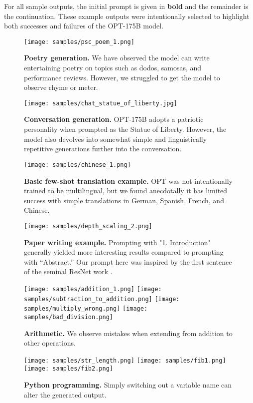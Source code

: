 \documentclass[11pt]{article}
\newcommand{\OPT}[0]{{OPT-175B}}
\begin{document}
For all sample outputs, the initial prompt is given in {\bf bold} and the remainder is the continuation. These example outputs were intentionally selected to highlight both successes and failures of the \OPT{} model.

\begin{figure}[h]
    \centering
    \texttt{[image: samples/psc\_poem\_1.png]}
    \caption{{\bf Poetry generation.} We have observed the model can write entertaining poetry on topics such as dodos, samosas, and performance reviews. However, we struggled to get the model to observe rhyme or meter.}
    \label{fig:psc_poem}
\end{figure}

\begin{figure}[h]
    \centering
    \texttt{[image: samples/chat\_statue\_of\_liberty.jpg]}
    \caption{{\bf Conversation generation.} \OPT{} adopts a patriotic personality when prompted as the Statue of Liberty. However, the model also devolves into somewhat simple and linguistically repetitive generations further into the conversation.}
    \label{fig:chat}
\end{figure}

\begin{figure}[h]
    \centering
    \texttt{[image: samples/chinese\_1.png]}
    \caption{{\bf Basic few-shot translation example.} OPT{} was not intentionally trained to be multilingual, but we found anecdotally it has limited success with simple translations in German, Spanish, French, and Chinese.}
    \label{fig:chinese}
\end{figure}

\begin{figure}[h]
    \centering
    \texttt{[image: samples/depth\_scaling\_2.png]}
    \caption{{\bf Paper writing example.} Prompting with "1. Introduction" generally yielded more interesting results compared to prompting with ``Abstract.'' Our prompt here was inspired by the first sentence of the seminal ResNet work \cite{he2016deep}.}
    \label{fig:ai_paper}
\end{figure}

\begin{figure}[h]
    \centering
    \texttt{[image: samples/addition\_1.png]}
    \texttt{[image: samples/subtraction\_to\_addition.png]}
    \texttt{[image: samples/multiply\_wrong.png]}
    \texttt{[image: samples/bad\_division.png]}
    \caption{{\bf Arithmetic.} We observe mistakes when extending from addition to other operations.}
    \label{fig:arithmetic}
\end{figure}

\begin{figure}[h]
    \centering
    \texttt{[image: samples/str\_length.png]}
    \texttt{[image: samples/fib1.png]}
    \texttt{[image: samples/fib2.png]}
    \caption{{\bf Python programming.} Simply switching out a variable name can alter the generated output.}
    \label{fig:python}
\end{figure} 
\end{document}

